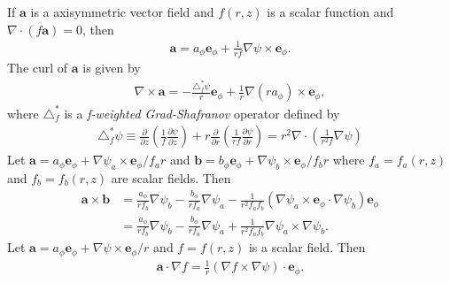 \documentclass[11pt, reqno]{amsart}
\newcommand{\pfrac}[2]{\frac{\partial #1}{\partial #2}}
\newcommand{\mvec}[1]{\mathbf{#1}}
\newcommand{\eep}{\mvec{e}_\phi}
\theoremstyle{definition}
\begin{document}
If $\mvec{a}$ is a axisymmetric vector field and $f(r,z)$ is a
scalar function and $\nabla \cdot (f\mvec{a}) = 0$, then
\begin{align}
  \mvec{a} = a_\phi \eep + \frac{1}{rf}\nabla\psi \times \eep. \label{id:divAF}
\end{align}
The curl of $\mvec{a}$ is given by
\begin{align}
  \nabla\times\mvec{a} = -\frac{\triangle^*_f\psi}{r}\eep
  + \frac{1}{r} \nabla(ra_\phi)\times\eep, \label{eq:curlaf}
\end{align}
where $\triangle^*_f$ is a \emph{f-weighted Grad-Shafranov} operator
defined by
\begin{align}
  \triangle^*_f\psi \equiv 
  \frac{\partial}{\partial z}\left(\frac{1}{f} \pfrac{\psi}{z}\right)
  + r \frac{\partial}{\partial r}
  \left(\frac{1}{rf}\pfrac{\psi}{r}\right)
  =
  r^2\nabla\cdot\left(\frac{1}{r^2f}\nabla\psi\right)
\end{align}
Let $\mvec{a}=a_\phi\eep + \nabla\psi_a \times \eep/f_ar$ and
$\mvec{b}=b_\phi\eep + \nabla\psi_b \times \eep/f_br$ where
$f_a=f_a(r,z)$ and $f_b=f_b(r,z)$ are scalar fields. Then
\begin{align}
  \mvec{a}\times\mvec{b} &=
  \frac{a_\phi}{rf_b}\nabla\psi_b
  -
  \frac{b_\phi}{rf_a}\nabla\psi_a
  -\frac{1}{r^2f_af_b}(\nabla\psi_a \times \eep \cdot \nabla\psi_b)\eep \\
  &= \frac{a_\phi}{rf_b}\nabla\psi_b
  -
  \frac{b_\phi}{rf_a}\nabla\psi_a
  +\frac{1}{r^2f_af_b}\nabla\psi_a \times \nabla\psi_b. \label{id:acrossb}
\end{align}
Let $\mvec{a}=a_\phi\eep + \nabla\psi \times \eep/r$ and $f=f(r,z)$ is
a scalar field. Then
\begin{align}
  \mvec{a}\cdot\nabla f = \frac{1}{r} 
  (\nabla f \times \nabla{\psi})\cdot\eep.
  \label{id:aAotGradF}
\end{align}



\end{document}
